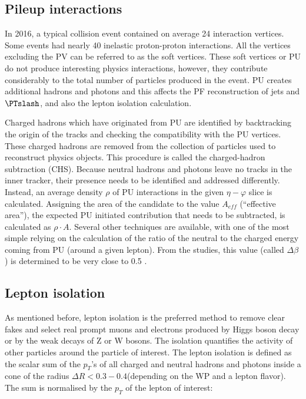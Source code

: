 \subsection{Pileup interactions}\label{sec:pileup}

In 2016, a typical collision event contained on average 24 interaction vertices. Some events had nearly 40 inelastic proton-proton interactions. All the vertices excluding the PV can be referred to as the soft vertices. These soft vertices or PU do not produce interesting physics interactions, however, they contribute considerably to the total number of particles produced in the event. PU creates additional hadrons and photons and this affects the PF reconstruction of jets and $\PTslash$, and also the lepton isolation calculation.

Charged hadrons which have originated from PU are identified by backtracking the origin of the tracks and checking the compatibility with the PU vertices. These charged hadrons are removed from the collection of particles used to reconstruct physics objects. This procedure is called the charged-hadron subtraction (CHS). Because neutral hadrons and photons leave no tracks in the inner tracker, their presence needs to be identified and addressed differently. Instead, an average density $\rho$ of PU interactions in the given $\eta - \varphi$ slice is calculated. Assigning the area of the candidate to the value $A_{eff}$ (``effective area''), the expected PU initiated contribution that needs to be subtracted, is calculated as $\rho \cdot A$. Several other techniques are available, with one of the most simple relying on the calculation of the ratio of the neutral to the charged energy coming from PU (around a given lepton). From the studies, this value (called $\Delta \beta$) is determined to be very close to 0.5 \cite{PU_mitigation}. 

\subsection{Lepton isolation}\label{sec:isolation}

As mentioned before, lepton isolation is the preferred method to remove clear fakes and select real  prompt  muons  and  electrons  produced  by Higgs boson decay or by the weak decays of Z or W bosons. The isolation quantifies the activity of other particles around the particle of interest. The lepton isolation is defined as the scalar sum of the $p_T$'s of all charged and neutral hadrons and photons inside a cone of the radius $\Delta R <  0.3 - 0.4 $(depending on the WP and a lepton flavor). The sum is normalised by the $p_T$ of the lepton of interest:

